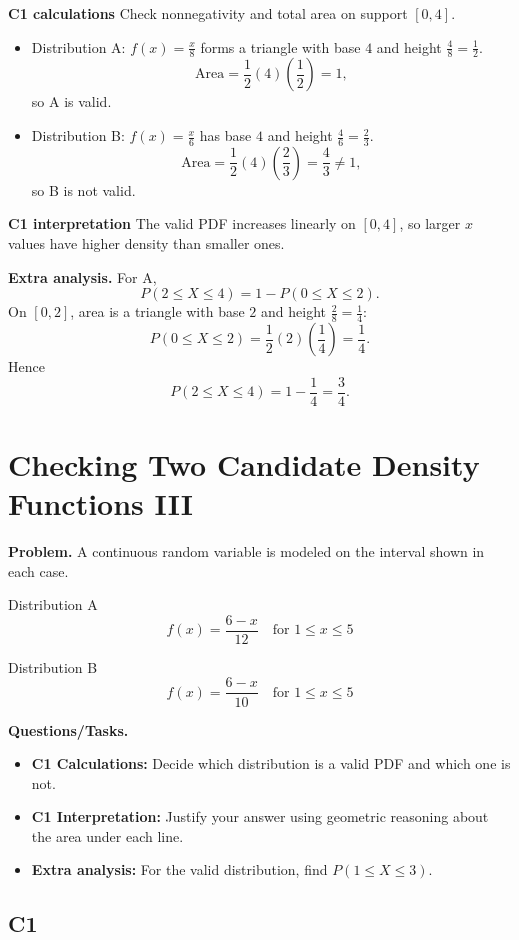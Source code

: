 \textbf{C1 calculations}
Check nonnegativity and total area on support $[0,4]$.
\begin{itemize}
	\item Distribution A: $f(x)=\frac{x}{8}$ forms a triangle with base $4$ and height $\frac{4}{8}=\frac12$.
	\[
	\text{Area}=\frac12(4)\left(\frac12\right)=1,
	\]
	so A is valid.
	\item Distribution B: $f(x)=\frac{x}{6}$ has base $4$ and height $\frac{4}{6}=\frac23$.
	\[
	\text{Area}=\frac12(4)\left(\frac23\right)=\frac43\ne1,
	\]
	so B is not valid.
\end{itemize}

\textbf{C1 interpretation}
The valid PDF increases linearly on $[0,4]$, so larger $x$ values have higher density than smaller ones.

\textbf{Extra analysis.}
For A,
\[
P(2\le X\le4)=1-P(0\le X\le2).
\]
On $[0,2]$, area is a triangle with base $2$ and height $\frac{2}{8}=\frac14$:
\[
P(0\le X\le2)=\frac12(2)\left(\frac14\right)=\frac14.
\]
Hence
\[
P(2\le X\le4)=1-\frac14=\frac34.
\]


\section{Checking Two Candidate Density Functions III}
	
	\textbf{Problem.}
	A continuous random variable is modeled on the interval shown in each case.
	
	Distribution A
	\[
	f(x)=\frac{6-x}{12}\quad\text{for }1\le x\le 5
	\]
	
	Distribution B
	\[
	f(x)=\frac{6-x}{10}\quad\text{for }1\le x\le 5
	\]
	
	\textbf{Questions/Tasks.}
	\begin{itemize}
		\item \textbf{C1 Calculations:} Decide which distribution is a valid PDF and which one is not.
		\item \textbf{C1 Interpretation:} Justify your answer using geometric reasoning about the area under each line.
		\item \textbf{Extra analysis:} For the valid distribution, find $P(1\le X\le 3)$.
	\end{itemize}
	
	\subsection*{C1}
	
